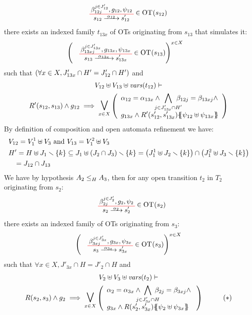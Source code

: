 \documentclass[runningheads]{llncs}
\begin{document}
\begin{enumerate}
\begin{align*}
		&  \OTx{12}{}{12}{12} \in \fOT{s_{12}}
\end{align*}		
there exists an indexed family $t_{13x}$ of OTs originating from $s_{13}$ that simulates it: 
\begin{align*}
		&  \mpar{\OTx{13}{x}{13x}{13x} \in \fOT{s_{13}}}^{x \in X}
\end{align*}	
such that  $\mpar{\forall x \in X, J'_{13x} \cap H' = J'_{12} \cap H'}$ and
\begin{multline*}	
V_{12} \uplus V_{13} \uplus \fvars{t_{12}} \vdash\\ R'\mpar{s_{12}, s_{13}} \wedge g_{12} \implies \operatorname*{\bigsymb{\bigvee}}_{x \in X} \mpar{\everymath{\displaystyle}\begin{array}{l}
			\alpha_{12} = \alpha_{13x} \wedge \bigwedge_\subbox{j \in J'_{13x} \cap H'} \beta_{12j} = \beta_{13xj} \wedge\\[12pt]
			 g_{13x} \wedge R'\mpar{s'_{12}, s'_{13x}}\psubst{\psi_{12} \uplus \psi_{13x}}
		\end{array}} 
	\end{multline*}
By definition of composition and open automata refinement we have: 
\begin{align*}
&V_{12}= V^1_1\uplus V_3 \text{ and }
V_{13}= V^2_1\uplus V_3\\
& H'=H\uplus J_1 \setminus \{k\} \subseteq J_1\uplus \mpar{J_2 \cap J_3} \setminus \{k\}= \mpar{J^1_1\uplus J_2 \setminus \{k\} } \cap \mpar{J^2_1\uplus J_3 \setminus \{k\}} \\ &\,\,\,\,\, = J_{12 } \cap J_{13} 
\end{align*}
We have by hypothesis $\wrel{A_2}{A_3}{H}$, then for any open transition $t_2$ in $T_2$  originating from $s_2$:
\begin{align*}
\OTx{2}{}{2}{2} \in \fOT{s_2}
\end{align*}
there exists an indexed family of OTs originating from $s_{3}$: 
\begin{align*}
\mpar{\OTx{3}{x}{3x}{3x} \in \fOT{s_{3}}}^{x \in X} 
\end{align*}
such that $\forall x \in X, J'_{3x} \cap H = J'_2 \cap H$ and
\begin{multline*}
V_2 \uplus V_3 \uplus \fvars{t_2} \vdash\\ R\mpar{s_2, s_3} \wedge g_2 \implies \operatorname*{\bigsymb{\bigvee}}_{x \in X} \mpar{\everymath{\displaystyle}
\begin{array}{l}
			\alpha_2 = \alpha_{3x} \wedge \bigwedge_\subbox{j \in J'_{3x} \cap H} \beta_{2j} = \beta_{3xj} \nwedge\\
			 g_{3x} \wedge R\mpar{s'_2, s'_{3x}}\psubst{\psi_2 \uplus \psi_{3x}}
		\end{array}}  \qquad \quad (*)
\end{multline*}	
\smallskip




\end{enumerate}
\end{document}
